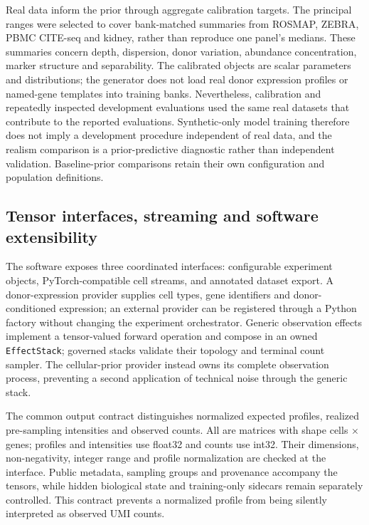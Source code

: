 Real data inform the prior through aggregate calibration targets. The principal ranges were selected to cover bank-matched summaries from ROSMAP, ZEBRA, PBMC CITE-seq and kidney, rather than reproduce one panel's medians. These summaries concern depth, dispersion, donor variation, abundance concentration, marker structure and separability. The calibrated objects are scalar parameters and distributions; the generator does not load real donor expression profiles or named-gene templates into training banks. Nevertheless, calibration and repeatedly inspected development evaluations used the same real datasets that contribute to the reported evaluations. Synthetic-only model training therefore does not imply a development procedure independent of real data, and the realism comparison is a prior-predictive diagnostic rather than independent validation. Baseline-prior comparisons retain their own configuration and population definitions.

\subsection*{Tensor interfaces, streaming and software extensibility}
\label{sec:simulator-software}

The software exposes three coordinated interfaces: configurable experiment objects, PyTorch-compatible cell streams\cite{paszke2019pytorch}, and annotated dataset export. A donor-expression provider supplies cell types, gene identifiers and donor-conditioned expression; an external provider can be registered through a Python factory without changing the experiment orchestrator. Generic observation effects implement a tensor-valued forward operation and compose in an owned \texttt{EffectStack}; governed stacks validate their topology and terminal count sampler. The cellular-prior provider instead owns its complete observation process, preventing a second application of technical noise through the generic stack.

The common output contract distinguishes normalized expected profiles, realized pre-sampling intensities and observed counts. All are matrices with shape cells $\times$ genes; profiles and intensities use float32 and counts use int32. Their dimensions, non-negativity, integer range and profile normalization are checked at the interface. Public metadata, sampling groups and provenance accompany the tensors, while hidden biological state and training-only sidecars remain separately controlled. This contract prevents a normalized profile from being silently interpreted as observed UMI counts.

